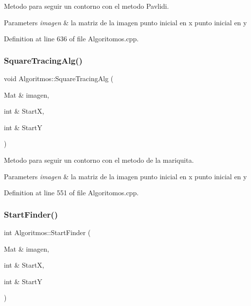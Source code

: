 Metodo para seguir un contorno con el metodo Pavlidi. 


\begin{DoxyParams}{Parameters}
{\em imagen} & la matriz de la imagen  punto inicial en x  punto inicial en y \\
\hline
\end{DoxyParams}


Definition at line 636 of file Algoritomos.\+cpp.

\mbox{\label{class_algoritmos_aebbedc5cd4fab6665d5181556a8da6d9}} 
\subsubsection{\texorpdfstring{Square\+Tracing\+Alg()}{SquareTracingAlg()}}
{\footnotesize\ttfamily void Algoritmos\+::\+Square\+Tracing\+Alg (\begin{DoxyParamCaption}\item[{Mat \&}]{imagen,  }\item[{int \&}]{StartX,  }\item[{int \&}]{StartY }\end{DoxyParamCaption})}



Metodo para seguir un contorno con el metodo de la mariquita. 


\begin{DoxyParams}{Parameters}
{\em imagen} & la matriz de la imagen  punto inicial en x  punto inicial en y \\
\hline
\end{DoxyParams}


Definition at line 551 of file Algoritomos.\+cpp.

\mbox{\label{class_algoritmos_ac13812392fa14dd08d07ac6167df72a4}} 
\subsubsection{\texorpdfstring{Start\+Finder()}{StartFinder()}}
{\footnotesize\ttfamily int Algoritmos\+::\+Start\+Finder (\begin{DoxyParamCaption}\item[{Mat \&}]{imagen,  }\item[{int \&}]{StartX,  }\item[{int \&}]{StartY }\end{DoxyParamCaption})}



